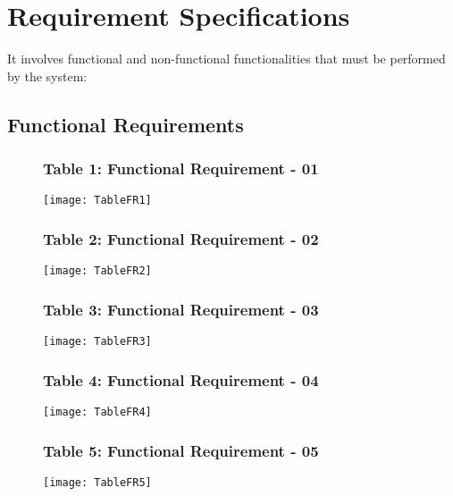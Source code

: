 \section{Requirement Specifications}
It involves functional and non-functional functionalities that must be performed by the system:

\subsection{Functional Requirements}

\begin{figure}[h]
\subsubsection{Table 1: Functional Requirement - 01}
\centering
\texttt{[image: TableFR1]}
\end{figure}

\begin{figure}[h]
\subsubsection{Table 2: Functional Requirement - 02}
\centering
\texttt{[image: TableFR2]}
\end{figure}

\begin{figure}[h]
\subsubsection{Table 3: Functional Requirement - 03}
\centering
\texttt{[image: TableFR3]}
\end{figure}

\begin{figure}[h]
\subsubsection{Table 4: Functional Requirement - 04}
\centering
\texttt{[image: TableFR4]}
\end{figure}

\begin{figure}[h]
\subsubsection{Table 5: Functional Requirement - 05}
\centering
\texttt{[image: TableFR5]}
\end{figure}


